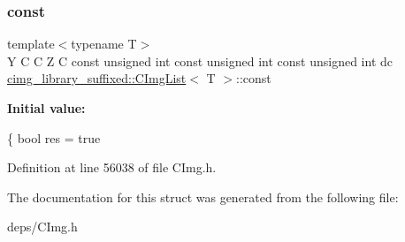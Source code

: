 \subsubsection{\texorpdfstring{const}{const}}
{\footnotesize\ttfamily template$<$typename T$>$ \\
Y C C Z C const unsigned int const unsigned int const unsigned int dc \hyperlink{structcimg__library__suffixed_1_1CImgList}{cimg\+\_\+library\+\_\+suffixed\+::\+C\+Img\+List}$<$ T $>$\+::const}

{\bfseries Initial value\+:}
\begin{DoxyCode}
\{
      \textcolor{keywordtype}{bool} res = \textcolor{keyword}{true}
\end{DoxyCode}


Definition at line 56038 of file C\+Img.\+h.



The documentation for this struct was generated from the following file\+:\begin{DoxyCompactItemize}
\item 
deps/C\+Img.\+h\end{DoxyCompactItemize}

